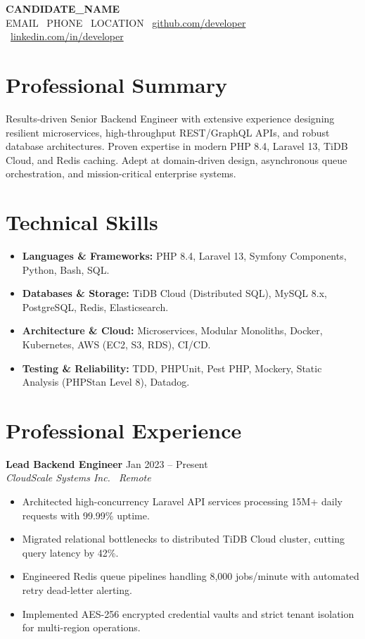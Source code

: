 \documentclass[10pt,a4paper]{article}
\begin{document}
\begin{center}
    {\huge \textbf{{{CANDIDATE_NAME}}}}\\[3pt]
    \small {{EMAIL}} \textbar\ {{PHONE}} \textbar\ {{LOCATION}} \textbar\ \href{https://github.com/candidate}{github.com/developer} \textbar\ \href{https://linkedin.com/in/candidate}{linkedin.com/in/developer}
\end{center}

\vspace{-4pt}
\section{Professional Summary}
Results-driven Senior Backend Engineer with extensive experience designing resilient microservices, high-throughput REST/GraphQL APIs, and robust database architectures. Proven expertise in modern PHP 8.4, Laravel 13, TiDB Cloud, and Redis caching. Adept at domain-driven design, asynchronous queue orchestration, and mission-critical enterprise systems.

\section{Technical Skills}
\begin{itemize}
    \item \textbf{Languages \& Frameworks:} PHP 8.4, Laravel 13, Symfony Components, Python, Bash, SQL.
    \item \textbf{Databases \& Storage:} TiDB Cloud (Distributed SQL), MySQL 8.x, PostgreSQL, Redis, Elasticsearch.
    \item \textbf{Architecture \& Cloud:} Microservices, Modular Monoliths, Docker, Kubernetes, AWS (EC2, S3, RDS), CI/CD.
    \item \textbf{Testing \& Reliability:} TDD, PHPUnit, Pest PHP, Mockery, Static Analysis (PHPStan Level 8), Datadog.
\end{itemize}

\section{Professional Experience}
\textbf{Lead Backend Engineer} \hfill Jan 2023 -- Present\\
\textit{CloudScale Systems Inc. \textbar\ Remote}
\begin{itemize}
    \item Architected high-concurrency Laravel API services processing 15M+ daily requests with 99.99\% uptime.
    \item Migrated relational bottlenecks to distributed TiDB Cloud cluster, cutting query latency by 42\%.
    \item Engineered Redis queue pipelines handling 8,000 jobs/minute with automated retry dead-letter alerting.
    \item Implemented AES-256 encrypted credential vaults and strict tenant isolation for multi-region operations.
\end{itemize}
\end{document}
